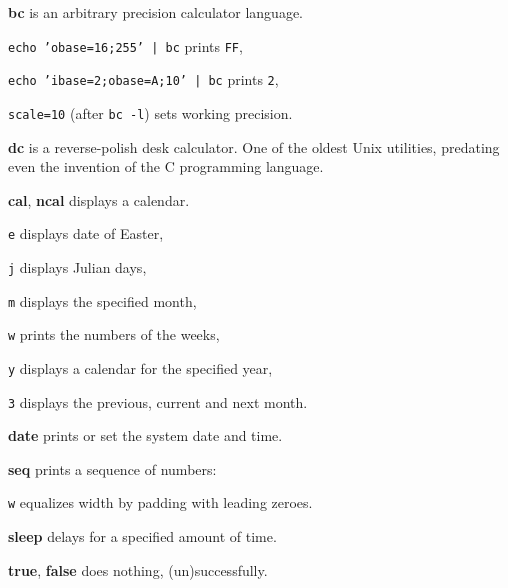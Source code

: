 \begin{enumx}
\item [\cmd] \textbf{bc} is an arbitrary precision calculator language.
\item \texttt{echo 'obase=16;255' | bc} prints \texttt{FF},
\item \texttt{echo 'ibase=2;obase=A;10' | bc} prints \texttt{2},
\item \texttt{scale=10} (after \texttt{bc -l}) sets working precision.
\item [\cmd] \textbf{dc} is a reverse-polish desk calculator.
One of the oldest Unix utilities, 
predating even the invention of the C programming language.
\item [\cmd] \textbf{cal}, \textbf{ncal} displays a calendar.
\item [\texttt{e}] displays date of Easter,
\item [\texttt{j}] displays Julian days,
\item [\texttt{m}] displays the specified month,
\item [\texttt{w}] prints the numbers of the weeks,
\item [\texttt{y}] displays a calendar for the specified year,
\item [\texttt{3}] displays the previous, current and next month.
\item [\cmd] \textbf{date} prints or set the system date and time.
\item [\cmdblack] \textbf{seq} prints a sequence of numbers:
\item [\texttt{w}] equalizes width by padding with leading zeroes.
\item [\cmdblack] \textbf{sleep} delays for a specified amount of time.
\item [\cmd] \textbf{true}, \textbf{false} does nothing, (un)successfully.
\end{enumx}